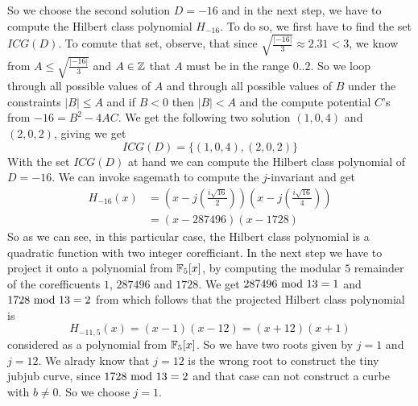 \begin{example}
So we choose the second solution $D=-16$ and in the next step, we have to compute the Hilbert class polynomial $H_{-16}$. To do so, we first have to find the set $ICG(D)$. To comute that set, observe, that since $\sqrt{\frac{|-16|}{3}}\approx 2.31<3$, we know from $A\leq \sqrt{\frac{|-16|}{3}}$ and $A\in\mathbb{Z}$ that $A$ must be in the range $0..2$. So we loop through all possible values of $A$ and through all possible values of $B$ under the constraints $|B|\leq A$ and if $B<0$ then $|B|<A$
and the compute potential $C$'s from $-16 = B^2 -4AC$. We get the following two solution $(1,0,4)$ and $(2,0,2)$, giving
we get
$$
ICG(D)=\{(1,0,4),(2,0,2)\}
$$
With the set $ICG(D)$ at hand we can compute the Hilbert class polynomial of $D=-16$. We can invoke sagemath to compute the $j$-invariant and get
\begin{align*}
H_{-16}(x) &= \left(x - j\left(\frac{i\sqrt{16}}{2}\right)\right)
 \left(x - j\left(\frac{i\sqrt{16}}{4}\right)\right) \\
           &= (x- 287496)(x-1728)
\end{align*}
So as we can see, in this particular case, the Hilbert class polynomial is a quadratic function with two integer corefficiant. In the next step we have to project it onto a polynomial from $\mathbb{F}_5[x]$, by computing the modular $5$ remainder of the corefficuents $1$, $287496$ and $1728$. We get $287496 \text{ mod } 13=1$ and $1728 \text{ mod } 13=2$ from which follows that the projected Hilbert class polynomial is
$$
H_{-11,5}(x)=(x-1)(x-12)= (x+12)(x+1)
$$
considered as a polynomial from $\mathbb{F}_5[x]$. So we have two roots given by $j=1$ and $j=12$. We alrady know that $j=12$ is the wrong root to construct the tiny jubjub curve, since $1728 \text{ mod } 13=2$ and that case can not construct a curbe with $b\neq 0$. So we choose $j=1$.


\end{example}
